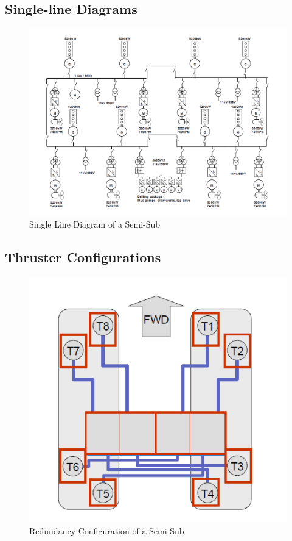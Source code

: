 \subsection{Single-line Diagrams}\label{Sec:Single-line_diagrams}
\begin{figure}[H]
    \centering
    \includegraphics[width = \textwidth ]{figures/Comp_SingleLineDiagram.png}
    \caption{Single Line Diagram of a Semi-Sub \cite{MarReg1Comp}}
    \label{fig:Comp_SingleLineDiagram}
\end{figure}



\newpage
\subsection{Thruster Configurations} \label{Sec:ThrusterConfiguratons}
\begin{figure}[h!]
    \centering
    \includegraphics[width = \textwidth ]{figures/PP_RedundancyConfig.png}
    \caption{Redundancy Configuration of a Semi-Sub \cite{LectureNote11PowerSystemDesign}}
    \label{fig:PP_RedundancyConfig}
\end{figure}

